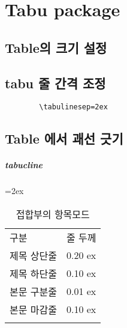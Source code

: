 	\newpage
	\chapter{Tabu package}




%
%
%	
	\clearpage
	\section{Table의 크기 설정}



%
%
%	
	\clearpage
	\section{tabu 줄 간격 조정}

		\begin{verbatim}
		\tabulinesep=2ex
		\end{verbatim}




%
%
%	
	\clearpage
	\section{Table 에서 괘선 긋기}


	\paragraph{tabucline}

		\begin{table}[h]
		\caption{접합부의 항목모드}
		\tabulinesep=2ex
		\begin{tabu} to 1.0\textwidth { X[r,m, 1.0] X[c,m, 1.0] }
		\tabucline[0.2ex]{-}		
		구분			&줄 두께\\
		\tabucline[0.1ex]{-}		
		제목 상단줄 	&0.20 ex \\
		\tabucline[0.01ex]{-}		
		제목 하단줄 	&0.10 ex \\
		\tabucline[0.01ex]{-}		
		본문 구분줄 	&0.01 ex \\
		\tabucline[0.01ex]{-}		
		본문 마감줄 	&0.10 ex \\
		\tabucline[0.1ex]{-}		
		\end{tabu}
		\end{table}


